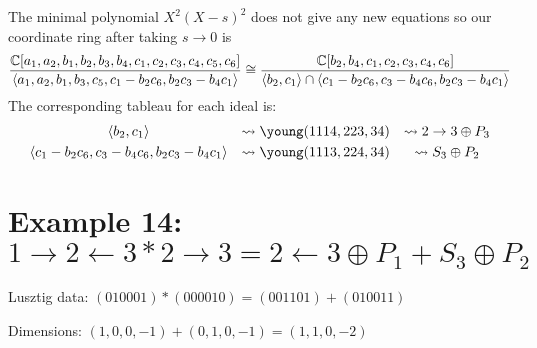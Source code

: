 \documentclass{article}
\begin{document}
The minimal polynomial $X^2(X-s)^2$ does not give any new equations so our coordinate ring after taking $s \rightarrow 0$ is
$$\frac{\mathbb C[a_1,a_2,b_1,b_2,b_3,b_4,c_1,c_2,c_3,c_4,c_5,c_6]}{\langle a_1,a_2,b_1,b_3,c_5, c_1-b_2c_6,b_2c_3-b_4c_1 \rangle} \cong \frac{\mathbb C[b_2,b_4,c_1,c_2,c_3,c_4,c_6]}{\langle b_2,c_1 \rangle \cap \langle c_1-b_2c_6, c_3-b_4c_6, b_2c_3-b_4c_1 \rangle}$$
The corresponding tableau for each ideal is:
\[\begin{array}{ccc}\vspace{1mm}
    \langle b_2,c_1 \rangle &\leadsto \young(1114,223,34) &\leadsto 2 \rightarrow 3 \oplus P_3 \\ 
    \langle c_1-b_2c_6,c_3-b_4c_6,b_2c_3-b_4c_1 \rangle &\leadsto \young(1113,224,34) &\leadsto S_3 \oplus P_2
\end{array}
\]

\section{Example 14: $1 \rightarrow 2 \leftarrow 3 * 2 \rightarrow 3 = 2 \leftarrow 3 \oplus P_1  + S_3 \oplus P_2$}
Lusztig data: $(010001) * (000010) = (001101) + (010011)$

Dimensions: $(1,0,0,-1) + (0,1,0,-1) = (1,1,0,-2)$
\end{document}
